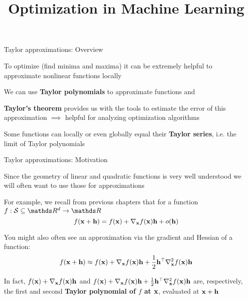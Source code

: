 \documentclass[11pt,compress,t,notes=noshow, xcolor=table]{beamer}
\title{Optimization in Machine Learning}
\begin{document}


\begin{frame2}{Taylor approximations: Overview}

\begin{itemizeM}
    \item To optimize (find minima and maxima) it can be extremely helpful to approximate nonlinear functions locally 
    \item We can use \textbf{Taylor polynomials} to approximate functions and
    \item \textbf{Taylor's theorem} provides us with the tools to estimate the error of this approximation $\implies$ helpful for analyzing optimization algorithms
    \item Some functions can locally or even globally equal their \textbf{Taylor series}, i.e. the limit of Taylor polynomials
\end{itemizeM}

{}

\end{frame2}


\begin{framei}{Taylor approximations: Motivation}

    \item Since the geometry of linear and quadratic functions is very well understood we will often want to use those for approximations
    \item For example, we recall from previous chapters that for a function $f: \mathcal{S}\subseteq \R^d \to \R$
    $$
    f(\mathbf{x}+\mathbf{h})=f(\mathbf{x})+\nabla_{\mathbf{x}}f(\mathbf{x}) \mathbf{h}+o(\mathbf{h})
    $$
    \item You might also often see an approximation via the gradient and Hessian of a function:
    $$
    f(\mathbf{x}+\mathbf{h})\approx f(\mathbf{x})+\nabla_{\mathbf{x}}f(\mathbf{x}) \mathbf{h}+\frac{1}{2}\mathbf{h}^\top \nabla^2_{\mathbf{x}}f(\mathbf{x}) \mathbf{h}
    $$
    \item In fact, $f(\mathbf{x})+\nabla_{\mathbf{x}}f(\mathbf{x}) \mathbf{h}$ and $f(\mathbf{x})+\nabla_{\mathbf{x}}f(\mathbf{x}) \mathbf{h}+\frac{1}{2}\mathbf{h}^\top \nabla^2_{\mathbf{x}}f(\mathbf{x})\mathbf{h}$ are, respectively, the first and second \textbf{Taylor polynomial of $f$ at $\mathbf{x}$}, evaluated at $\mathbf{x}+\mathbf{h}$
    
\end{framei}
\end{document}
